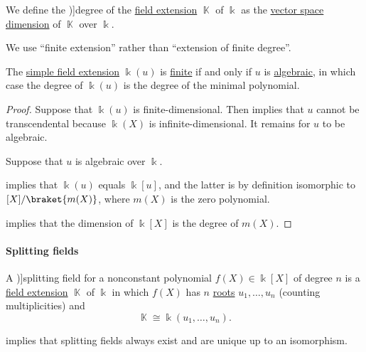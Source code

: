 \begin{definition}\label{def:field_extension_degree}
  We define the \term[ru=степень (def. \cite[9.5.1]{Винберг2014})]{degree} of the \hyperref[def:field/submodel]{field extension} \( \BbbK \) of \( \Bbbk \) as the \hyperref[thm:vector_space_dimension]{vector space dimension} of \( \BbbK \) over \( \Bbbk \).

  We use \enquote{finite extension} rather than \enquote{extension of finite degree}.
\end{definition}

\begin{proposition}\label{thm:simple_extension_dimension}
  The \hyperref[def:simple_field_extension]{simple field extension} \( \Bbbk(u) \) is \hyperref[def:field_extension_degree]{finite} if and only if \( u \) is \hyperref[def:algebraic_element]{algebraic}, in which case the degree of \( \Bbbk(u) \) is the degree of the minimal polynomial.
\end{proposition}
\begin{proof}
  \SufficiencySubProof Suppose that \( \Bbbk(u) \) is finite-dimensional. Then  implies that \( u \) cannot be transcendental because \( \Bbbk(X) \) is infinite-dimensional. It remains for \( u \) to be algebraic.

  \NecessitySubProof Suppose that \( u \) is algebraic over \( \Bbbk \).

   implies that \( \Bbbk(u) \) equals \( \Bbbk[u] \), and the latter is by definition isomorphic to \( \Bbbk[X] / \braket{ m(X) } \), where \( m(X) \) is the zero polynomial.

   implies that the dimension of \( \Bbbk[X] \) is the degree of \( m(X) \).
\end{proof}

\paragraph{Splitting fields}

\begin{definition}\label{def:splitting_field}
  A \term[ru=поле разложения (def. \cite[9.5.2]{Винберг2014})]{splitting field} for a nonconstant polynomial \( f(X) \in \Bbbk[X] \) of degree \( n \) is a \hyperref[def:field/submodel]{field extension} \( \BbbK \) of \( \Bbbk \) in which \( f(X) \) has \( n \) \hyperref[def:polynomial_root]{roots} \( u_1, \ldots, u_n \) (counting multiplicities) and
  \begin{equation*}
    \BbbK \cong \Bbbk(u_1, \ldots, u_n).
  \end{equation*}
\end{definition}
\begin{comments}
  \item {} implies that splitting fields always exist and are unique up to an isomorphism.
\end{comments}

